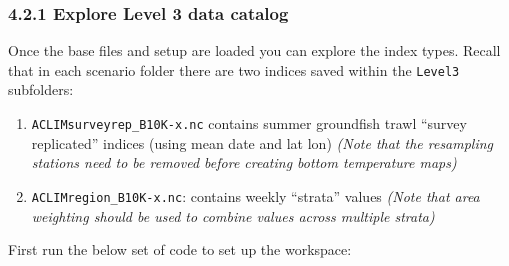\documentclass[
]{article}
\providecommand{\tightlist}{%
  \setlength{\itemsep}{0pt}\setlength{\parskip}{0pt}}
\begin{document}
\hypertarget{explore-level-3-data-catalog}{%
\subsubsection{4.2.1 Explore Level 3 data
catalog}\label{explore-level-3-data-catalog}}

Once the base files and setup are loaded you can explore the index
types. Recall that in each scenario folder there are two indices saved
within the \texttt{Level3} subfolders:

\begin{enumerate}
\def\labelenumi{\arabic{enumi})}
\tightlist
\item
  \texttt{ACLIMsurveyrep\_B10K-x.nc} contains summer groundfish trawl
  ``survey replicated'' indices (using mean date and lat lon)
  \emph{(Note that the resampling stations need to be removed before
  creating bottom temperature maps)}\\
\item
  \texttt{ACLIMregion\_B10K-x.nc}: contains weekly ``strata'' values
  \emph{(Note that area weighting should be used to combine values
  across multiple strata)}
\end{enumerate}

First run the below set of code to set up the workspace:
\end{document}
